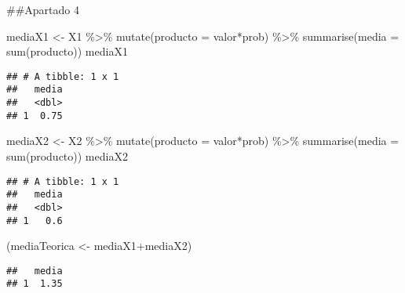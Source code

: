 \documentclass[
]{article}
\newenvironment{Shaded}{\begin{snugshade}}{\end{snugshade}}
\newcommand{\AttributeTok}[1]{\textcolor[rgb]{0.77,0.63,0.00}{#1}}
\newcommand{\FunctionTok}[1]{\textcolor[rgb]{0.00,0.00,0.00}{#1}}
\newcommand{\NormalTok}[1]{#1}
\newcommand{\OtherTok}[1]{\textcolor[rgb]{0.56,0.35,0.01}{#1}}
\newcommand{\SpecialCharTok}[1]{\textcolor[rgb]{0.00,0.00,0.00}{#1}}
\begin{document}
\#\#Apartado 4

\begin{Shaded}
\begin{Highlighting}[]
\NormalTok{mediaX1 }\OtherTok{\textless{}{-}}\NormalTok{ X1 }\SpecialCharTok{\%\textgreater{}\%} 
  \FunctionTok{mutate}\NormalTok{(}\AttributeTok{producto =}\NormalTok{ valor}\SpecialCharTok{*}\NormalTok{prob) }\SpecialCharTok{\%\textgreater{}\%} 
  \FunctionTok{summarise}\NormalTok{(}\AttributeTok{media =} \FunctionTok{sum}\NormalTok{(producto))}
\NormalTok{mediaX1}
\end{Highlighting}
\end{Shaded}

\begin{verbatim}
## # A tibble: 1 x 1
##   media
##   <dbl>
## 1  0.75
\end{verbatim}

\begin{Shaded}
\begin{Highlighting}[]
\NormalTok{mediaX2 }\OtherTok{\textless{}{-}}\NormalTok{ X2 }\SpecialCharTok{\%\textgreater{}\%} 
  \FunctionTok{mutate}\NormalTok{(}\AttributeTok{producto =}\NormalTok{ valor}\SpecialCharTok{*}\NormalTok{prob) }\SpecialCharTok{\%\textgreater{}\%} 
  \FunctionTok{summarise}\NormalTok{(}\AttributeTok{media =} \FunctionTok{sum}\NormalTok{(producto))}
\NormalTok{mediaX2}
\end{Highlighting}
\end{Shaded}

\begin{verbatim}
## # A tibble: 1 x 1
##   media
##   <dbl>
## 1   0.6
\end{verbatim}

\begin{Shaded}
\begin{Highlighting}[]
\NormalTok{(mediaTeorica }\OtherTok{\textless{}{-}}\NormalTok{ mediaX1}\SpecialCharTok{+}\NormalTok{mediaX2)}
\end{Highlighting}
\end{Shaded}

\begin{verbatim}
##   media
## 1  1.35
\end{verbatim}
\end{document}
